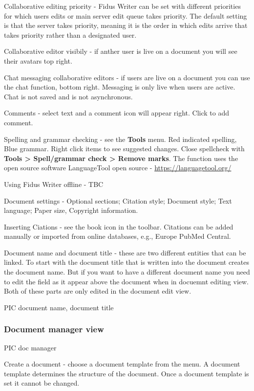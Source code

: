 \documentclass{article}
\begin{document}
Collaborative editing priority - Fidus Writer can be set with different priorities for which users edits or main server edit queue takes priority. The default setting is that the server takes priority, meaning it is the order in which edits arrive that takes priority rather than a designated user.


Collaborative editor visibily - if anther user is live on a document you will see their avatars top right.


Chat messaging collaborative editors - if users are live on a document you can use the chat function, bottom right. Messaging is only live when users are active. Chat is not saved and is not asynchronous.


Comments - select text and a comment icon will appear right. Click to add comment.


Spelling and grammar checking - see the \textbf{Tools} menu. Red indicated spelling, Blue grammar. Right click items to see suggested changes. Close spellcheck with \textbf{Tools > Spell/grammar check > Remove marks}. The function uses the open source software LanguageTool open source - \href{https://languagetool.org/}{https://languagetool.org/} 


Using Fidus Writer offline - TBC


Document settings - Optional sections; Citation style; Document style; Text language; Paper size, Copyright information.


Inserting Ciations - see the book icon in the toolbar. Citations can be added manually or imported from online databases, e.g., Europe PubMed Central.


Document name and document title - these are two different entities that can be linked. To start with the document title that is written into the document creates the document name. But if you want to have a different document name you need to edit the field as it appear above the document when in docuemnt editing view. Both of these parts are only edited in the document edit view.


PIC document name, document title


\subsubsection{Document manager view}\label{H7829280}



PIC doc manager


Create a document - choose a document template from the menu. A document template determines the structure of the document. Once a document template is set it cannot be changed.
\end{document}
